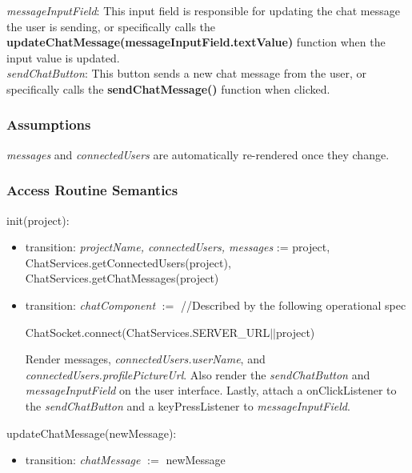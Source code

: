 \documentclass[12pt, titlepage]{article}
\begin{document}
	\noindent \textit{messageInputField}: This input field is responsible for updating the chat message the user is sending, or specifically calls the \textbf{updateChatMessage(messageInputField.textValue)} function when the input value is updated.\\
	
	\noindent \textit{sendChatButton}: This button sends a new chat message from the user, or specifically calls the \textbf{sendChatMessage()} function when clicked.
	
	\subsubsection{Assumptions}
	
	\textit{messages} and \textit{connectedUsers} are automatically re-rendered once they change.
	
	\subsubsection{Access Routine Semantics}
	
	\noindent init(project):
	\begin{itemize}
		
		\item transition: \textit{projectName, connectedUsers, messages} := project,\\ ChatServices.getConnectedUsers(project), ChatServices.getChatMessages(project)
		
		\item transition: \textit{chatComponent} $:=$ //Described by the following operational spec
		
		\noindent ChatSocket.connect(ChatServices.SERVER\_URL$||$project)
		
		\noindent Render messages, \textit{connectedUsers.userName}, and \textit{connectedUsers.profilePictureUrl}. Also render the \textit{sendChatButton} and \textit{messageInputField} on the user interface. Lastly, attach a onClickListener to the \textit{sendChatButton} and a keyPressListener to \textit{messageInputField}.
		
	\end{itemize}
	
	\noindent updateChatMessage(newMessage):
	\begin{itemize}
		\item transition: \textit{chatMessage} $:=$ newMessage
	\end{itemize}
	
\end{document}

